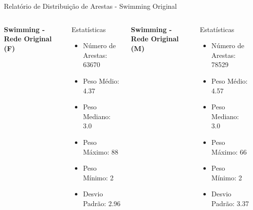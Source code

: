 
\begin{frame}{Relatório de Distribuição de Arestas - Swimming Original}
    \begin{columns}
        \textbf{Swimming - Rede Original (F)}
        \begin{block}{Estatísticas}
            \begin{itemize}
                \item Número de Arestas: 63670
                \item Peso Médio: 4.37
                \item Peso Mediano: 3.0
                \item Peso Máximo: 88
                \item Peso Mínimo: 2
                \item Desvio Padrão: 2.96
            \end{itemize}
        \end{block}

        \textbf{Swimming - Rede Original (M)}
        \begin{block}{Estatísticas}
            \begin{itemize}
                \item Número de Arestas: 78529
                \item Peso Médio: 4.57
                \item Peso Mediano: 3.0
                \item Peso Máximo: 66
                \item Peso Mínimo: 2
                \item Desvio Padrão: 3.37
            \end{itemize}
        \end{block}
    \end{columns}
\end{frame}